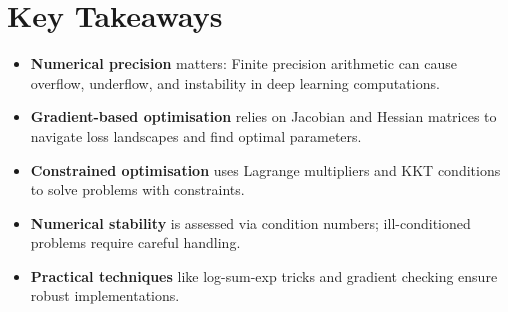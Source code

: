 
\section*{Key Takeaways}

\begin{keytakeaways}
\begin{itemize}[leftmargin=2em]
    \item \textbf{Numerical precision} matters: Finite precision arithmetic can cause overflow, underflow, and instability in deep learning computations.
    \item \textbf{Gradient-based optimisation} relies on Jacobian and Hessian matrices to navigate loss landscapes and find optimal parameters.
    \item \textbf{Constrained optimisation} uses Lagrange multipliers and KKT conditions to solve problems with constraints.
    \item \textbf{Numerical stability} is assessed via condition numbers; ill-conditioned problems require careful handling.
    \item \textbf{Practical techniques} like log-sum-exp tricks and gradient checking ensure robust implementations.
\end{itemize}
\end{keytakeaways}


